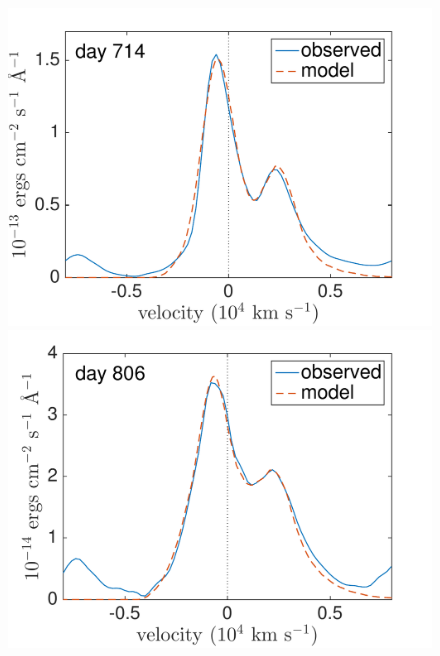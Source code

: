 \begin{figure}
\centering

\includegraphics[trim =0 35 0 0,clip=true,scale=0.37]{chapters/chapter5/images/clump_1/best_fit/d714OI_ext.pdf}
\hspace{0mm}
\includegraphics[trim =0 35 0 0,clip=true,scale=0.37]{chapters/chapter5/images/clump_1/best_fit/d806OI_ext.pdf}


\end{figure}
